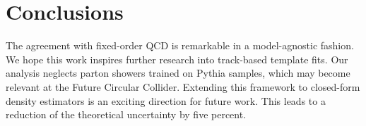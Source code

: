 \section{Conclusions}\label{sec:conclusions}

The agreement with fixed-order QCD is remarkable in a model-agnostic
fashion. We hope this work inspires further research into track-based
template fits. Our analysis neglects parton showers trained on Pythia
samples, which may become relevant at the Future Circular Collider.
Extending this framework to closed-form density estimators is an
exciting direction for future work. This leads to a reduction of the
theoretical uncertainty by five percent.

